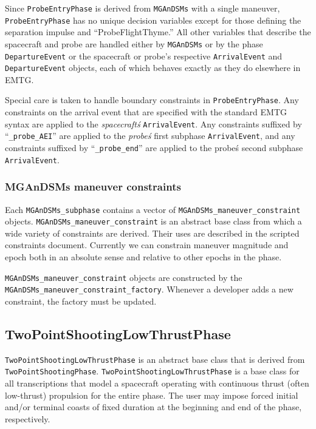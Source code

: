 Since \texttt{ProbeEntryPhase} is derived from \texttt{MGAnDSMs} with a single maneuver, \texttt{ProbeEntryPhase} has no unique decision variables except for those defining the separation impulse and ``ProbeFlightThyme.'' All other variables that describe the spacecraft and probe are handled either by \texttt{MGAnDSMs} or by the phase \texttt{DepartureEvent} or the spacecraft or probe's respective \texttt{ArrivalEvent} and \texttt{DepartureEvent} objects, each of which behaves exactly as they do elsewhere in \ac{EMTG}.

Special care is taken to handle boundary constraints in \texttt{ProbeEntryPhase}. Any constraints on the arrival event that are specified with the standard \ac{EMTG} syntax are applied to the \textit{spacecraft\'s} \texttt{ArrivalEvent}. Any constraints suffixed by ``\texttt{\_probe\_AEI}'' are applied to the \textit{probe\'s} first subphase \texttt{ArrivalEvent}, and any constraints suffixed by ``\texttt{\_probe\_end}'' are applied to the probe\'s second subphase \texttt{ArrivalEvent}.

\subsubsection{MGAnDSMs maneuver constraints}
\label{subsubsec:MGAnDSMs_maneuver_constraints}

Each \texttt{MGAnDSMs\_subphase} contains a vector of \texttt{MGAnDSMs\_maneuver\_constraint} objects. \texttt{MGAnDSMs\_maneuver\_constraint} is an abstract base class from which a wide variety of constraints are derived. Their uses are described in the scripted constraints document. Currently we can constrain maneuver magnitude and epoch both in an absolute sense and relative to other epochs in the phase.

\texttt{MGAnDSMs\_maneuver\_constraint} objects are constructed by the \texttt{MGAnDSMs\_maneuver\_constraint\_factory}. Whenever a developer adds a new constraint, the factory must be updated.

\subsection{TwoPointShootingLowThrustPhase}
\label{subsec:TwoPointShootingLowThrustPhase}

\texttt{TwoPointShootingLowThrustPhase} is an abstract base class that is derived from \texttt{TwoPointShootingPhase}. \texttt{TwoPointShootingLowThrustPhase} is a base class for all transcriptions that model a spacecraft operating with continuous thrust (often low-thrust) propulsion for the entire phase. The user may impose forced initial and/or terminal coasts of fixed duration at the beginning and end of the phase, respectively.

